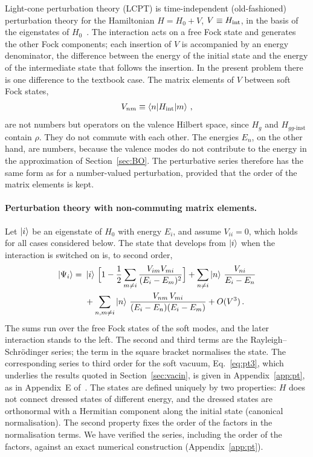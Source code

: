 Light-cone perturbation theory (LCPT) is time-independent (old-fashioned) perturbation theory for the Hamiltonian $H=H_0+V$, $V\equiv H_{\rm int}$, in the basis of the eigenstates of $H_0$~\cite{Lepage:1980fj,Brodsky:1997de}. The interaction acts on a free Fock state and generates the other Fock components; each insertion of $V$ is accompanied by an energy denominator, the difference between the energy of the initial state and the energy of the intermediate state that follows the insertion. In the present problem there is one difference to the textbook case. The matrix elements of $V$ between soft Fock states,
\begin{align}
V_{nm}\equiv\braket{n|H_{\rm int}|m}\,,
\end{align}
are not numbers but operators on the valence Hilbert space, since $H_g$ and $H_{gg\text{-inst}}$ contain $\rho$. They do not commute with each other. The energies $E_n$, on the other hand, are numbers, because the valence modes do not contribute to the energy in the approximation of Section~\ref{sec:BO}. The perturbative series therefore has the same form as for a number-valued perturbation, provided that the order of the matrix elements is kept.

\paragraph{Perturbation theory with non-commuting matrix elements.} Let $\ket i$ be an eigenstate of $H_0$ with energy $E_i$, and assume $V_{ii}=0$, which holds for all cases considered below. The state that develops from $\ket i$ when the interaction is switched on is, to second order,
\begin{align}\label{eq:pt2}
\ket{\Psi_i}=\ &\ket i\,\Big[1-\frac12\sum_{m\neq i}\frac{V_{im}V_{mi}}{(E_i-E_m)^2}\Big]
+\sum_{n\neq i}\ket n\,\frac{V_{ni}}{E_i-E_n}\notag\\
&+\sum_{n,m\neq i}\ket n\,\frac{V_{nm}\,V_{mi}}{(E_i-E_n)(E_i-E_m)}+O(V^3)\,.
\end{align}
The sums run over the free Fock states of the soft modes, and the later interaction stands to the left. The second and third terms are the Rayleigh--Schr\"odinger series; the term in the square bracket normalises the state. The corresponding series to third order for the soft vacuum, Eq.~\eqref{eq:pt3}, which underlies the results quoted in Section~\ref{sec:vacin}, is given in Appendix~\ref{app:pt}, as in Appendix~E of~\cite{Lublinsky:2016meo}. The states are defined uniquely by two properties: $H$ does not connect dressed states of different energy, and the dressed states are orthonormal with a Hermitian component along the initial state (canonical normalisation). The second property fixes the order of the factors in the normalisation terms. We have verified the series, including the order of the factors, against an exact numerical construction (Appendix~\ref{app:pt}).

